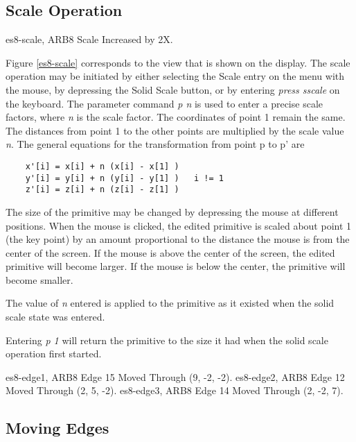 \subsection{Scale Operation}
\mfig es8-scale, ARB8 Scale Increased by 2X.


Figure \ref{es8-scale} corresponds to the view that is shown on the display.
The scale operation may be initiated by either selecting
the Scale entry  on the menu with the mouse,
by depressing the Solid Scale button,
or by entering {\em press sscale} on the keyboard.
The parameter command {\em p n} is
used to enter a precise scale factors, where {\em n} is
the scale factor.
The coordinates of point 1 remain the same.  The distances
from point 1 to the other points are multiplied by the scale value {\em n}.
The general equations for the transformation from point p to p' are

\begin{verbatim}
    x'[i] = x[i] + n (x[i] - x[1] )
    y'[i] = y[i] + n (y[i] - y[1] )   i != 1
    z'[i] = z[i] + n (z[i] - z[1] )
\end{verbatim}

The size of the primitive may be changed by depressing the mouse at
different positions.  When the mouse is clicked, the
edited primitive is scaled about point 1 (the key point)
by an amount proportional
to the distance the mouse is from the center of the screen.  If the mouse 
is above the center of the screen, the edited primitive will become larger.
If the
mouse is below the center, the primitive will become smaller.

The value of {\em n} entered is applied to the primitive as it existed when the
solid scale state was entered.

Entering {\em p 1} will return the primitive
to the size it had when the solid scale operation first started.


\mfig es8-edge1, ARB8 Edge 15 Moved Through (9, -2, -2).
\mfig es8-edge2, ARB8 Edge 12 Moved Through (2, 5, -2).
\mfig es8-edge3, ARB8 Edge 14 Moved Through (2, -2, 7).
\subsection{Moving Edges}

